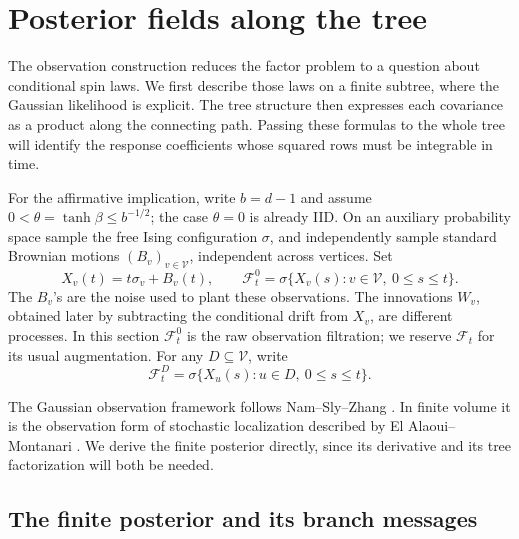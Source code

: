 \section{Posterior fields along the tree}
\label{sec:observations}

The observation construction reduces the factor problem to a question
about conditional spin laws.  We first describe those laws on a finite
subtree, where the Gaussian likelihood is explicit.  The tree structure
then expresses each covariance as a product along the connecting path.
Passing these formulas to the whole tree will identify the response
coefficients whose squared rows must be integrable in time.

For the affirmative implication, write \(b=d-1\) and assume
\(0<\theta=\tanh\beta\le b^{-1/2}\); the case \(\theta=0\) is already
IID.  On an auxiliary probability space sample the free Ising
configuration \(\sigma\), and independently sample standard Brownian
motions \((B_v)_{v\in\mathcal V}\), independent across vertices.  Set
\begin{equation}
\label{eq:observations}
 X_v(t)=t\sigma_v+B_v(t),\qquad
 \mathcal F_t^0
   =\sigma\{X_v(s):v\in\mathcal V,\ 0\le s\le t\}.
\end{equation}
The \(B_v\)'s are the noise used to plant these observations.  The
innovations \(W_v\), obtained later by subtracting the conditional drift
from \(X_v\), are different processes.  In this section
\(\mathcal F_t^0\) is the raw observation filtration; we reserve
\(\mathcal F_t\) for its usual augmentation.  For any
\(D\subseteq\mathcal V\), write
\[
 \mathcal F_t^D
   =\sigma\{X_u(s):u\in D,\ 0\le s\le t\}.
\]

The Gaussian observation framework follows Nam--Sly--Zhang
\cite{NSZ}.  In finite volume it is the observation form of stochastic
localization described by El Alaoui--Montanari
\cite[Section~3]{ElAlaouiMontanari2022}.  We derive the finite posterior
directly, since its derivative and its tree factorization will both be
needed.

\subsection{The finite posterior and its branch messages}

